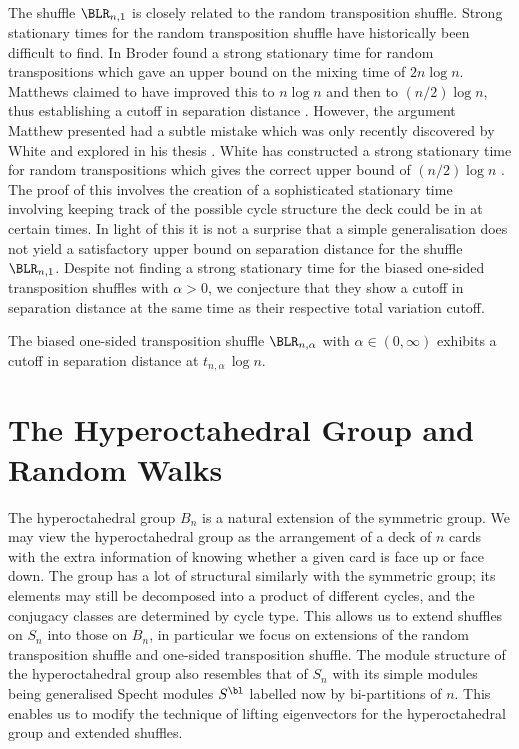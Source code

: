 \documentclass[11pt]{report}
\begin{document}
\paragraph{}
The shuffle $\BLR_{n,1}$ is closely related to the random transposition shuffle.  Strong stationary times for the random transposition shuffle have historically been difficult to find. In \cite{broderthesis} Broder found a strong stationary time for random transpositions which gave an upper bound on the mixing time of $2n\log n$. Matthews claimed to have improved this to $n\log n$ and then to $(n/2)\log n$, thus establishing a cutoff in separation distance \cite{matthews1988strong}. However, the argument Matthew presented had a subtle mistake which was only recently discovered by White and explored in his thesis \cite{whitethesis}. White has constructed a strong stationary time for random transpositions which gives the correct upper bound of $(n/2)\log n$ \cite{white2019strong}. The proof of this involves the creation of a sophisticated stationary time involving keeping track of the possible cycle structure the deck could be in at certain times. In light of this it is not a 
surprise that a simple generalisation does not yield a satisfactory upper bound on separation distance for the shuffle $\BLR_{n,1}$. Despite not finding a strong stationary time for the biased one-sided transposition shuffles with $\alpha >0$, we conjecture that they show a cutoff in separation distance at the same time as their respective total variation cutoff. 

\begin{conj}
	The biased one-sided transposition shuffle $\BLR_{n,\alpha}$ with $\alpha \in (0,\infty)$ exhibits a cutoff in separation distance at $t_{n,\alpha}\,\log n$.
\end{conj}





	

\chapter{The Hyperoctahedral Group and Random Walks}
\label{chpt6:chpt}

The hyperoctahedral group $B_{n}$ is a natural extension of the symmetric group. We may view the hyperoctahedral group as the arrangement of a deck of $n$ cards with the extra information of knowing whether a given card is face up or face down. The group has a lot of structural similarly with the symmetric group; its elements may still be decomposed into a product of different cycles, and the conjugacy classes are determined by cycle type. This allows us to extend shuffles on $S_{n}$ into those on $B_{n}$, in particular we focus on extensions of the random transposition shuffle and one-sided transposition shuffle.
The module structure of the hyperoctahedral group also resembles that of $S_{n}$ with its simple modules being generalised Specht modules $S^{\bl}$ labelled now by bi-partitions of $n$. This enables us to modify the technique of lifting eigenvectors for the hyperoctahedral group and extended shuffles. 
\end{document}
